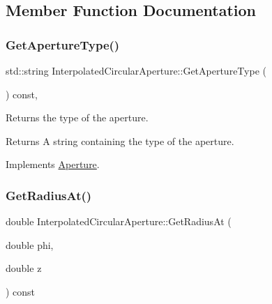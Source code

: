 \subsection{Member Function Documentation}
\mbox{\label{classInterpolatedCircularAperture_ad6c2112ec4e0bd1b21b679e3fab08704}} 
\subsubsection{\texorpdfstring{Get\+Aperture\+Type()}{GetApertureType()}}
{\footnotesize\ttfamily std\+::string Interpolated\+Circular\+Aperture\+::\+Get\+Aperture\+Type (\begin{DoxyParamCaption}{ }\end{DoxyParamCaption}) const\hspace{0.3cm}{\ttfamily [inline]}, {\ttfamily [virtual]}}

Returns the type of the aperture. \begin{DoxyReturn}{Returns}
A string containing the type of the aperture. 
\end{DoxyReturn}


Implements \hyperlink{classAperture_ad7af612271a0586feea83c38549dfb75}{Aperture}.

\mbox{\label{classInterpolatedCircularAperture_a4c614ba51b5da0e01808f719f6a7511f}} 
\subsubsection{\texorpdfstring{Get\+Radius\+At()}{GetRadiusAt()}}
{\footnotesize\ttfamily double Interpolated\+Circular\+Aperture\+::\+Get\+Radius\+At (\begin{DoxyParamCaption}\item[{double}]{phi,  }\item[{double}]{z }\end{DoxyParamCaption}) const\hspace{0.3cm}{\ttfamily [virtual]}}

